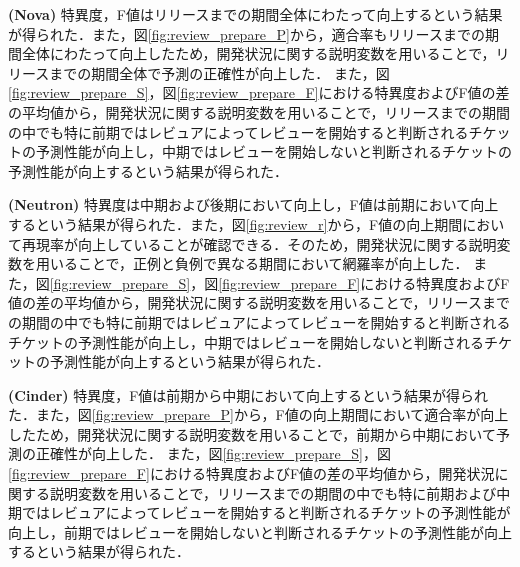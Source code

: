 \documentclass[submit]{ipsj}
\begin{document}
\textbf{ (Nova) }特異度，F値はリリースまでの期間全体にわたって向上するという結果が得られた．また，図\ref{fig:review_prepare_P}から，適合率もリリースまでの期間全体にわたって向上したため，開発状況に関する説明変数を用いることで，リリースまでの期間全体で予測の正確性が向上した．
また，図\ref{fig:review_prepare_S}，図\ref{fig:review_prepare_F}における特異度およびF値の差の平均値から，開発状況に関する説明変数を用いることで，リリースまでの期間の中でも特に前期ではレビュアによってレビューを開始すると判断されるチケットの予測性能が向上し，中期ではレビューを開始しないと判断されるチケットの予測性能が向上するという結果が得られた．

\textbf{ (Neutron) }特異度は中期および後期において向上し，F値は前期において向上するという結果が得られた．また，図\ref{fig:review_r}から，F値の向上期間において再現率が向上していることが確認できる．そのため，開発状況に関する説明変数を用いることで，正例と負例で異なる期間において網羅率が向上した．
また，図\ref{fig:review_prepare_S}，図\ref{fig:review_prepare_F}における特異度およびF値の差の平均値から，開発状況に関する説明変数を用いることで，リリースまでの期間の中でも特に前期ではレビュアによってレビューを開始すると判断されるチケットの予測性能が向上し，中期ではレビューを開始しないと判断されるチケットの予測性能が向上するという結果が得られた．

\textbf{ (Cinder) }特異度，F値は前期から中期において向上するという結果が得られた．また，図\ref{fig:review_prepare_P}から，F値の向上期間において適合率が向上したため，開発状況に関する説明変数を用いることで，前期から中期において予測の正確性が向上した．
また，図\ref{fig:review_prepare_S}，図\ref{fig:review_prepare_F}における特異度およびF値の差の平均値から，開発状況に関する説明変数を用いることで，リリースまでの期間の中でも特に前期および中期ではレビュアによってレビューを開始すると判断されるチケットの予測性能が向上し，前期ではレビューを開始しないと判断されるチケットの予測性能が向上するという結果が得られた．
\end{document}
